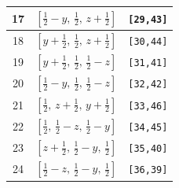 \documentclass[fleqn,8pt]{jsarticle}
\begin{document}
\begin{longtable}{ccc}
17 & $\left[ \frac{1}{2} - y,\, \frac{1}{2},\, z + \frac{1}{2} \right]$ & {\tt [29,43]} \\ \hline
18 & $\left[ y + \frac{1}{2},\, \frac{1}{2},\, z + \frac{1}{2} \right]$ & {\tt [30,44]} \\ \hline
19 & $\left[ y + \frac{1}{2},\, \frac{1}{2},\, \frac{1}{2} - z \right]$ & {\tt [31,41]} \\ \hline
20 & $\left[ \frac{1}{2} - y,\, \frac{1}{2},\, \frac{1}{2} - z \right]$ & {\tt [32,42]} \\ \hline
21 & $\left[ \frac{1}{2},\, z + \frac{1}{2},\, y + \frac{1}{2} \right]$ & {\tt [33,46]} \\ \hline
22 & $\left[ \frac{1}{2},\, \frac{1}{2} - z,\, \frac{1}{2} - y \right]$ & {\tt [34,45]} \\ \hline
23 & $\left[ z + \frac{1}{2},\, \frac{1}{2} - y,\, \frac{1}{2} \right]$ & {\tt [35,40]} \\ \hline
24 & $\left[ \frac{1}{2} - z,\, \frac{1}{2} - y,\, \frac{1}{2} \right]$ & {\tt [36,39]} \\
\end{longtable}
\renewcommand{\arraystretch}{1.2}
\end{document}
